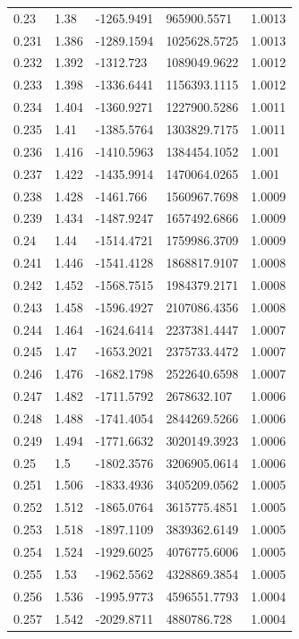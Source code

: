\begin{tabular}{lllll}
0.23 & 1.38 & -1265.9491 & 965900.5571 & 1.0013 \\
0.231 & 1.386 & -1289.1594 & 1025628.5725 & 1.0013 \\
0.232 & 1.392 & -1312.723 & 1089049.9622 & 1.0012 \\
0.233 & 1.398 & -1336.6441 & 1156393.1115 & 1.0012 \\
0.234 & 1.404 & -1360.9271 & 1227900.5286 & 1.0011 \\
0.235 & 1.41 & -1385.5764 & 1303829.7175 & 1.0011 \\
0.236 & 1.416 & -1410.5963 & 1384454.1052 & 1.001 \\
0.237 & 1.422 & -1435.9914 & 1470064.0265 & 1.001 \\
0.238 & 1.428 & -1461.766 & 1560967.7698 & 1.0009 \\
0.239 & 1.434 & -1487.9247 & 1657492.6866 & 1.0009 \\
0.24 & 1.44 & -1514.4721 & 1759986.3709 & 1.0009 \\
0.241 & 1.446 & -1541.4128 & 1868817.9107 & 1.0008 \\
0.242 & 1.452 & -1568.7515 & 1984379.2171 & 1.0008 \\
0.243 & 1.458 & -1596.4927 & 2107086.4356 & 1.0008 \\
0.244 & 1.464 & -1624.6414 & 2237381.4447 & 1.0007 \\
0.245 & 1.47 & -1653.2021 & 2375733.4472 & 1.0007 \\
0.246 & 1.476 & -1682.1798 & 2522640.6598 & 1.0007 \\
0.247 & 1.482 & -1711.5792 & 2678632.107 & 1.0006 \\
0.248 & 1.488 & -1741.4054 & 2844269.5266 & 1.0006 \\
0.249 & 1.494 & -1771.6632 & 3020149.3923 & 1.0006 \\
0.25 & 1.5 & -1802.3576 & 3206905.0614 & 1.0006 \\
0.251 & 1.506 & -1833.4936 & 3405209.0562 & 1.0005 \\
0.252 & 1.512 & -1865.0764 & 3615775.4851 & 1.0005 \\
0.253 & 1.518 & -1897.1109 & 3839362.6149 & 1.0005 \\
0.254 & 1.524 & -1929.6025 & 4076775.6006 & 1.0005 \\
0.255 & 1.53 & -1962.5562 & 4328869.3854 & 1.0005 \\
0.256 & 1.536 & -1995.9773 & 4596551.7793 & 1.0004 \\
0.257 & 1.542 & -2029.8711 & 4880786.728 & 1.0004 \\

\end{tabular}
